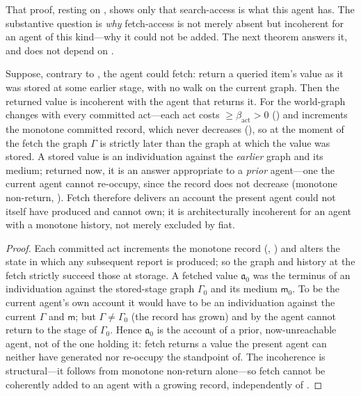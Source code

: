 \documentclass[11pt,twocolumn,a4paper]{article}
\newcommand{\Gph}{\Gamma}
\newcommand{\med}{\mathsf{m}}
\newcommand{\flo}{\beta}
\newcommand{\acct}{\mathfrak{a}}   %
\begin{document}
That proof, resting on , shows only that search-access
is what this agent has. The substantive question is \emph{why} fetch-access
is not merely absent but incoherent for an agent of this kind---why it could
not be added. The next theorem answers it, and does not depend on
.

\begin{theorem}
\label{thm:fetchincoherent}
Suppose, contrary to , the agent could fetch: return a
queried item's value as it was stored at some earlier stage, with no walk on
the current graph. Then the returned value is incoherent with the agent that
returns it. For the world-graph changes with every committed act---each act
costs $\ge\flo_{\mathrm{act}}>0$ () and increments the
monotone committed record, which never decreases (),
so at the moment of the fetch the graph $\Gph$ is strictly later than the
graph at which the value was stored. A stored value is an individuation against the
\emph{earlier} graph and its medium; returned now, it is an answer
appropriate to a \emph{prior} agent---one the current agent cannot re-occupy,
since the record does not decrease (monotone non-return,
). Fetch therefore delivers an account the present
agent could not itself have produced and cannot own; it is architecturally
incoherent for an agent with a monotone history, not merely excluded by
fiat.
\end{theorem}

\begin{proof}
Each committed act increments the monotone record (,
) and alters the state in which any subsequent
report is produced; so the graph and history at the fetch strictly succeed
those at storage. A fetched value $\acct_0$ was the terminus of an individuation
against the stored-stage graph $\Gph_0$ and its medium $\med_0$. To be the
current agent's own account it would have to be an individuation against the
current $\Gph$ and $\med$; but $\Gph\neq\Gph_0$ (the record has grown) and
by  the agent cannot return to the stage of
$\Gph_0$. Hence $\acct_0$ is the account of a prior, now-unreachable agent,
not of the one holding it: fetch returns a value the present agent can
neither have generated nor re-occupy the standpoint of. The incoherence is
structural---it follows from monotone non-return alone---so fetch cannot be
coherently added to an agent with a growing record, independently of
.
\end{proof}
\end{document}
